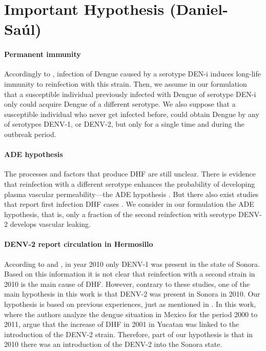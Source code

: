 \section*{Important Hypothesis (Daniel-Saúl)}
	\paragraph{Permanent immunity}
	Accordingly to \cite{WHO}, infection of Dengue caused by a serotype DEN-i
	induces long-life immunity to reinfection with this strain. Then, we
	assume in our formulation that a susceptible individual previously
	infected with Dengue of serotype DEN-i only could acquire Dengue of a 
	different serotype.  We also suppose that a susceptible individual who 
	never get infected before, could obtain Dengue by any of serotypes 
	DENV-1, or DENV-2, but only for a single time and during the outbreak 
	period.
%
	\paragraph{ADE hypothesis}
	The processes and factors that produce \ac{DHF} are still unclear. There is 
	evidence that reinfection with a different serotype enhances the probability 
	of developing plasma vascular permeability---the \ac{ADE} hypothesis 
	\citep[see, e.g.][p. 295]{Halstead1992}. 
	But there also exist studies that report first infection DHF cases 
	\cite{Debast1993}. We consider in our formulation the ADE hypothesis, that 
	is, only a fraction of the second reinfection with serotype \ac{DENV-2} 
	develops vascular leaking.
%
\paragraph{\ac{DENV-2} report circulation in Hermosillo}
According to \cite{Vazquez2011} and \cite{Reyes2017}, in year 2010 only DENV-1 was present in the state of Sonora. Based on this information it is not clear that reinfection with a second strain in 2010 is the main cause of DHF. However, contrary to these studies, one of the main hypothesis in this work is that DENV-2 was present in Sonora in 2010. Our hypothesis is based on previous experiences, just as mentioned in \cite{Gomez2014}. In this work, where the authors analyze the dengue situation in Mexico for the period 2000 to 2011, argue that the increase of DHF in 2001 in Yucatan was linked to the introduction of the DENV-2 strain. Therefore, part of our hypothesis is that in 2010 there was an introduction of the DENV-2 into the Sonora state. 

